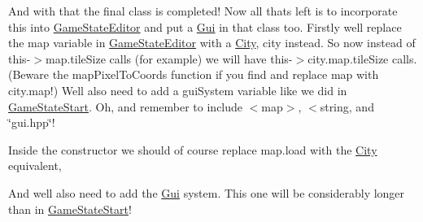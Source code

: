 And with that the final class is completed! Now all that\textquotesingle{}s left is to incorporate this into {\ttfamily \mbox{\hyperlink{classGameStateEditor}{Game\+State\+Editor}}} and put a {\ttfamily \mbox{\hyperlink{classGui}{Gui}}} in that class too. Firstly we\textquotesingle{}ll replace the {\ttfamily map} variable in {\ttfamily \mbox{\hyperlink{classGameStateEditor}{Game\+State\+Editor}}} with a {\ttfamily \mbox{\hyperlink{classCity}{City}}}, {\ttfamily city} instead. So now instead of {\ttfamily this-\/$>$map.\+tile\+Size} calls (for example) we will have {\ttfamily this-\/$>$city.\+map.\+tile\+Size} calls. (Beware the {\ttfamily map\+Pixel\+To\+Coords} function if you find and replace {\ttfamily map} with {\ttfamily city.\+map}!) We\textquotesingle{}ll also need to add a {\ttfamily gui\+System} variable like we did in {\ttfamily \mbox{\hyperlink{classGameStateStart}{Game\+State\+Start}}}. Oh, and remember to include {\ttfamily $<$map$>$}, {\ttfamily $<$string}, and {\ttfamily \char`\"{}gui.\+hpp\char`\"{}}!

Inside the constructor we should of course replace {\ttfamily map.\+load} with the {\ttfamily \mbox{\hyperlink{classCity}{City}}} equivalent,


\begin{DoxyCode}{0}

\end{DoxyCode}


And we\textquotesingle{}ll also need to add the {\ttfamily \mbox{\hyperlink{classGui}{Gui}}} system. This one will be considerably longer than in {\ttfamily \mbox{\hyperlink{classGameStateStart}{Game\+State\+Start}}}!


